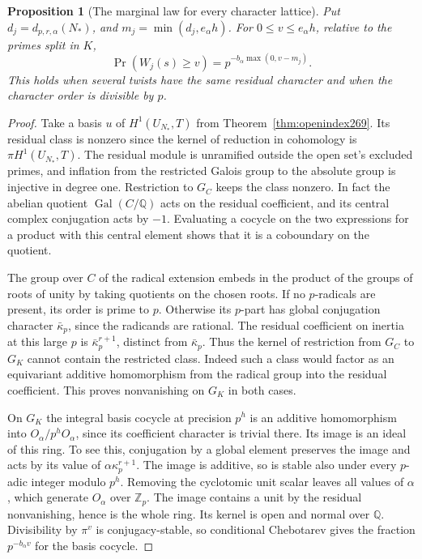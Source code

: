 \documentclass[a4paper,11pt]{article}
\newtheorem{proposition}{Proposition}[section]
\theoremstyle{definition}
\theoremstyle{remark}
\numberwithin{equation}{section}
\begin{document}
\begin{proposition}[The marginal law for every character lattice]\leavevmode
\label{prop:residue269}
Put \(d_j=d_{p,r,\alpha}(N_*)\), and \(m_j=\min(d_j,e_\alpha h)\).
For \(0\le v\le e_\alpha h\), relative to the primes split in \(K\),
\[
                 \Pr(W_j(s)\ge v)
                 =p^{-b_\alpha\max(0,v-m_j)} .
\]
This holds when several twists have the same residual
character and when the character order is divisible by \(p\).
\end{proposition}
\begin{proof}
Take a basis \(u\) of \(H^1(U_{N_*},T)\) from
Theorem~\ref{thm:openindex269}. Its residual class is nonzero since
the kernel of reduction in cohomology is \(\pi H^1(U_{N_*},T)\).
The residual module is unramified outside the open set's
excluded primes, and inflation from the restricted Galois
group to the absolute group is injective in degree one.
Restriction to \(G_C\) keeps the class nonzero. In fact the
abelian quotient \(\operatorname{Gal}(C/\mathbb Q)\) acts on
the residual coefficient, and its central complex conjugation
acts by \(-1\). Evaluating a cocycle on the two expressions
for a product with this central element shows that it is a
coboundary on the quotient.

The group over \(C\) of the radical extension embeds in the
product of the groups of roots of unity by taking quotients
on the chosen roots. If no \(p\)-radicals are present, its
order is prime to \(p\). Otherwise its \(p\)-part has global
conjugation character \(\bar\kappa_p\), since the radicands
are rational. The residual coefficient on inertia at this
large \(p\) is \(\bar\kappa_p^{r+1}\), distinct from
\(\bar\kappa_p\). Thus the kernel of restriction from
\(G_C\) to \(G_K\) cannot contain the restricted class.
Indeed such a class would factor as an equivariant additive
homomorphism from the radical group into the residual
coefficient. This proves nonvanishing on \(G_K\) in both cases.

On \(G_K\) the integral basis cocycle at precision \(p^h\)
is an additive homomorphism into \(O_\alpha/p^hO_\alpha\),
since its coefficient character is trivial there. Its
image is an ideal of this ring. To see this, conjugation
by a global element preserves the image and acts by its
value of \(\alpha\kappa_p^{r+1}\). The image is additive,
so is stable also under every \(p\)-adic integer modulo
\(p^h\). Removing the cyclotomic unit scalar leaves all
values of \(\alpha\), which generate \(O_\alpha\) over
\(\mathbb Z_p\). The image contains a unit by the residual
nonvanishing, hence is the whole ring. Its kernel is open
and normal over \(\mathbb Q\). Divisibility by \(\pi^v\) is
conjugacy-stable, so conditional Chebotarev gives the
fraction \(p^{-b_\alpha v}\) for the basis cocycle.


\end{proof}
\end{document}
